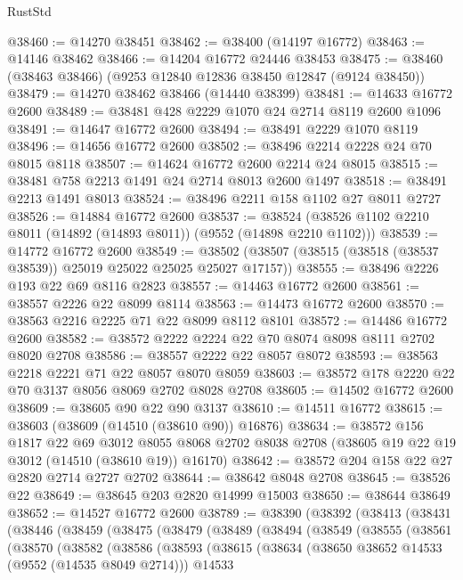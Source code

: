 \begin{lexlean}{RustStd}
\begin{coremodule}
@38460 := @14270 @38451
@38462 := @38400 (@14197 @16772)
@38463 := @14146 @38462
@38466 := @14204 @16772 @24446 @38453
@38475 := @38460 (@38463 @38466) (@9253 @12840 @12836 @38450 @12847 (@9124 @38450))
@38479 := @14270 @38462 @38466 (@14440 @38399)
@38481 := @14633 @16772 @2600
@38489 := @38481 @428 @2229 @1070 @24 @2714 @8119 @2600 @1096
@38491 := @14647 @16772 @2600
@38494 := @38491 @2229 @1070 @8119
@38496 := @14656 @16772 @2600
@38502 := @38496 @2214 @2228 @24 @70 @8015 @8118
@38507 := @14624 @16772 @2600 @2214 @24 @8015
@38515 := @38481 @758 @2213 @1491 @24 @2714 @8013 @2600 @1497
@38518 := @38491 @2213 @1491 @8013
@38524 := @38496 @2211 @158 @1102 @27 @8011 @2727
@38526 := @14884 @16772 @2600
@38537 := @38524 (@38526 @1102 @2210 @8011 (@14892 (@14893 @8011)) (@9552 (@14898 @2210 @1102)))
@38539 := @14772 @16772 @2600
@38549 := @38502 (@38507 (@38515 (@38518 (@38537 @38539)) @25019 @25022 @25025 @25027 @17157))
@38555 := @38496 @2226 @193 @22 @69 @8116 @2823
@38557 := @14463 @16772 @2600
@38561 := @38557 @2226 @22 @8099 @8114
@38563 := @14473 @16772 @2600
@38570 := @38563 @2216 @2225 @71 @22 @8099 @8112 @8101
@38572 := @14486 @16772 @2600
@38582 := @38572 @2222 @2224 @22 @70 @8074 @8098 @8111 @2702 @8020 @2708
@38586 := @38557 @2222 @22 @8057 @8072
@38593 := @38563 @2218 @2221 @71 @22 @8057 @8070 @8059
@38603 := @38572 @178 @2220 @22 @70 @3137 @8056 @8069 @2702 @8028 @2708
@38605 := @14502 @16772 @2600
@38609 := @38605 @90 @22 @90 @3137
@38610 := @14511 @16772
@38615 := @38603 (@38609 (@14510 (@38610 @90)) @16876)
@38634 := @38572
    @156
    @1817
    @22
    @69
    @3012
    @8055
    @8068
    @2702
    @8038
    @2708
    (@38605 @19 @22 @19 @3012 (@14510 (@38610 @19)) @16170)
@38642 := @38572 @204 @158 @22 @27 @2820 @2714 @2727 @2702
@38644 := @38642 @8048 @2708
@38645 := @38526 @22
@38649 := @38645 @203 @2820 @14999 @15003
@38650 := @38644 @38649
@38652 := @14527 @16772 @2600
@38789 := @38390
    (@38392
      (@38413
        (@38431
          (@38446
            (@38459
              (@38475
                (@38479
                  (@38489
                    (@38494
                      (@38549
                        (@38555
                          (@38561
                            (@38570
                              (@38582
                                (@38586
                                  (@38593
                                    (@38615
                                      (@38634
                                        (@38650 @38652 @14533 (@9552 (@14535 @8049 @2714)))
                                        @14533

\end{coremodule}
\end{lexlean}
